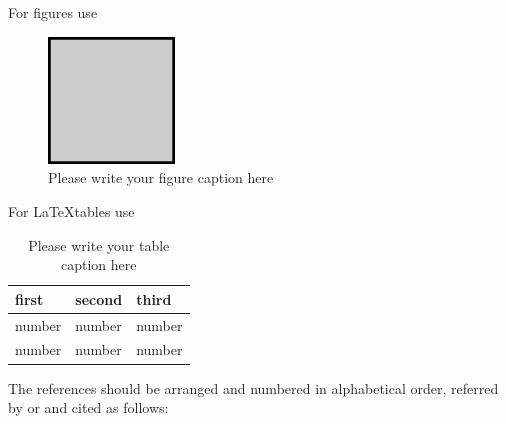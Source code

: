 \documentclass[dvips]{radhazu}
\begin{document}
For figures use
\begin{figure}[ht]
\begin{center}
\includegraphics[width=0.3\textwidth]{example.eps}
\caption{Please write your figure caption here}
\label{fig:1}       %
\end{center}
\end{figure}

For \LaTeX tables use
\begin{table}[ht]
\caption{Please write your table caption here}
\label{tab:1}       %
\begin{tabular}{lll}
\hline
first & second & third  \\
\hline
number & number & number \\
number & number & number \\
\end{tabular}
\end{table}





The references should be arranged and numbered in alphabetical
order, referred by \cite{agatutekveselic} or \cite{tadic} and
cited as follows:
\end{document}
